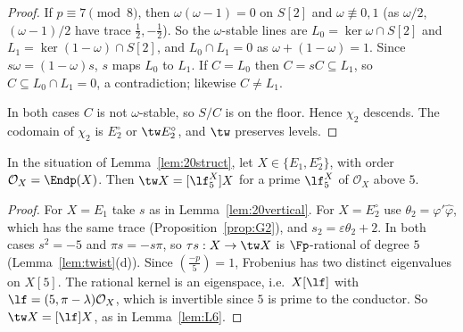 \begin{proof}
If $p\equiv7\pmod8$, then $\omega(\omega-1)=0$ on $S[2]$ and $\omega\not\equiv0,1$ (as $\omega/2$,
$(\omega-1)/2$ have trace $\frac12,-\frac12$).  So the $\omega$-stable lines are
$L_0=\ker\omega\cap S[2]$ and $L_1=\ker(1-\omega)\cap S[2]$, and $L_0\cap L_1=0$ as $\omega+(1-\omega)=1$.
Since $s\omega=(1-\omega)s$, $s$ maps $L_0$ to $L_1$.  If $C=L_0$ then $C=sC\subseteq L_1$, so
$C\subseteq L_0\cap L_1=0$, a contradiction; likewise $C\neq L_1$.

In both cases $C$ is not $\omega$-stable, so $S/C$ is on the floor.  Hence $\chi_2$ descends.
The codomain of $\chi_2$ is $E_2^\circ$ or $\tw E_2^\circ$, and $\tw$ preserves levels.
\end{proof}

\begin{lemma}\label{lem:20twist}
In the situation of Lemma~\ref{lem:20struct}, let $X\in\{E_1,E_2^\circ\}$, with order
$\mathcal O_X=\Endp(X)$.  Then $\tw X=[\lf_5^X]X$ for a prime $\lf_5^X$ of $\mathcal O_X$ above $5$.
\end{lemma}
\begin{proof}
For $X=E_1$ take $s$ as in Lemma~\ref{lem:20vertical}.  For $X=E_2^\circ$ use $\theta_2=\varphi'\widehat\varphi$,
which has the same trace (Proposition~\ref{prop:G2}), and $s_2=\varepsilon\theta_2+2$.  In both cases
$s^2=-5$ and $\pi s=-s\pi$, so $\tau s:X\to\tw X$ is $\Fp$-rational of degree $5$
(Lemma~\ref{lem:twist}(d)).  Since $(\frac{-p}5)=1$, Frobenius has two distinct eigenvalues on $X[5]$.
The rational kernel is an eigenspace, i.e.\ $X[\lf]$ with $\lf=(5,\pi-\lambda)\mathcal O_X$,
which is invertible since $5$ is prime to the conductor.  So $\tw X=[\lf]X$, as in
Lemma~\ref{lem:L6}.
\end{proof}


